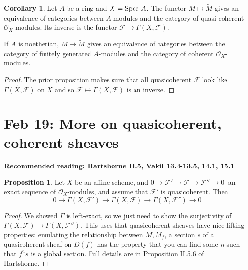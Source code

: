 \documentclass[10pt,reqno]{amsart}
\theoremstyle{definition}
\newtheorem{corollary}[theorem]{Corollary}
\newtheorem{proposition}[theorem]{Proposition}
\theoremstyle{remark}
\numberwithin{equation}{section}
\numberwithin{theorem}{section}
\newcommand{\OO}{{\mathcal O}}
\newcommand{\spec}{\textup{Spec }}
\newcommand{\FF}{{\mathscr F}}
\newcommand{\wt}{\widetilde}
\begin{document}
\begin{corollary} Let $A$ be a ring and $X = \spec A$. The functor $M \mapsto \wt{M}$ gives an equivalence of categories between $A$ modules and the category of quasi-coherent $\OO_X$-modules. Its inverse is the functor $\FF \mapsto \Gamma(X,\FF)$.

If $A$ is noetherian, $M \mapsto \wt{M}$ gives an equivalence of categories between the category of finitely generated $A$-modules and the category of coherent $\OO_X$-modules.
\end{corollary}
\begin{proof}
The prior proposition makes sure that all quasicoherent $\FF$ look like $\wt{\Gamma(X,\FF)}$ on $X$ and so $\FF \mapsto \Gamma(X,\FF)$ is an inverse.
\end{proof}
\section{Feb 19: More on quasicoherent, coherent sheaves}
\textbf{Recommended reading: Hartshorne II.5, Vakil 13.4-13.5, 14.1, 15.1}

\begin{proposition} Let $X$ be an affine scheme, and $0 \to \FF' \to \FF \to \FF'' \to 0$. an exact sequence of $\OO_X$-modules, and assume that $\FF'$ is quasicoherent. Then 
\[0 \to \Gamma(X,\FF') \to \Gamma(X,\FF) \to \Gamma(X,\FF'') \to 0\]
\end{proposition}
\begin{proof}
We showed $\Gamma$ is left-exact, so we just need to show the surjectivity of $\Gamma(X,\FF) \to \Gamma(X,\FF'')$. This uses that quasicoherent sheaves have nice lifting properties: emulating the relationship between $M, M_f$, a section $s$ of a quasicoherent sheaf on $D(f)$ has the property that you can find some $n$ such that $f^n s$ is a global section. Full details are in Proposition II.5.6 of Hartshorne.
\end{proof}
\end{document}
